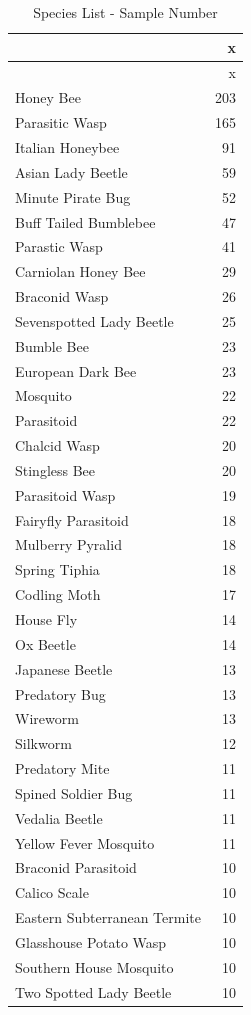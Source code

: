 \documentclass[
  12pt,
]{article}
\begin{document}
\begin{longtable}[]{@{}lr@{}}
\caption{Species List - Sample Number}\tabularnewline
\toprule
& x \\
\midrule
\endfirsthead
\toprule
& x \\
\midrule
\endhead
Honey Bee & 203 \\
Parasitic Wasp & 165 \\
Italian Honeybee & 91 \\
Asian Lady Beetle & 59 \\
Minute Pirate Bug & 52 \\
Buff Tailed Bumblebee & 47 \\
Parastic Wasp & 41 \\
Carniolan Honey Bee & 29 \\
Braconid Wasp & 26 \\
Sevenspotted Lady Beetle & 25 \\
Bumble Bee & 23 \\
European Dark Bee & 23 \\
Mosquito & 22 \\
Parasitoid & 22 \\
Chalcid Wasp & 20 \\
Stingless Bee & 20 \\
Parasitoid Wasp & 19 \\
Fairyfly Parasitoid & 18 \\
Mulberry Pyralid & 18 \\
Spring Tiphia & 18 \\
Codling Moth & 17 \\
House Fly & 14 \\
Ox Beetle & 14 \\
Japanese Beetle & 13 \\
Predatory Bug & 13 \\
Wireworm & 13 \\
Silkworm & 12 \\
Predatory Mite & 11 \\
Spined Soldier Bug & 11 \\
Vedalia Beetle & 11 \\
Yellow Fever Mosquito & 11 \\
Braconid Parasitoid & 10 \\
Calico Scale & 10 \\
Eastern Subterranean Termite & 10 \\
Glasshouse Potato Wasp & 10 \\
Southern House Mosquito & 10 \\
Two Spotted Lady Beetle & 10 \\

\end{longtable}
\end{document}
